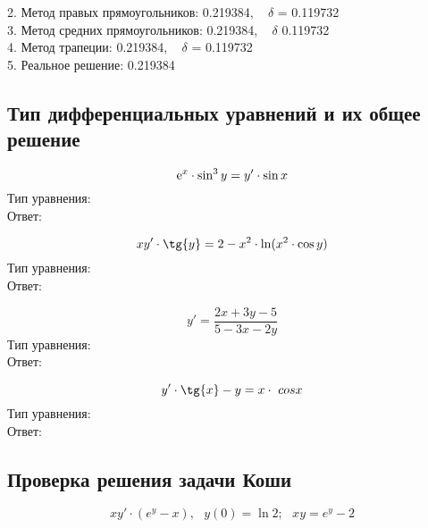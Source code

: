 \documentclass[14pt, titlepage, fleqn]{extarticle}
\begin{document}
2. Метод правых прямоугольников: 0.219384, ~ $\delta$ = 0.119732\\

3. Метод средних прямоугольников: 0.219384, ~ $\delta$ 0.119732\\

4. Метод трапеции: 0.219384, ~ $\delta$ = 0.119732\\

5. Реальное решение: 0.219384

\newpage
	\subsection*{Тип дифференциальных уравнений и их общее решение}

	$${\rm e}^{x} \cdot \sin^{3}{y} = y'\cdot \sin{x}$$ 
	Тип уравнения:\\	
	Ответ: 
	\begin{equation}
	\end{equation}

	$$xy' \cdot \tg{y} = 2 - x^2 \cdot \ln(x^2 \cdot \cos{y})$$
	Тип уравнения:\\
	Ответ:
	\begin{equation}
	\end{equation}

	$$y' = \frac{2x + 3y - 5}{5 - 3x - 2y}$$ 
	Тип уравнения:\\
	Ответ:
	\begin{equation}
	\end{equation}
	
	$$y' \cdot \tg{x} - y = x \cdot \ cos{x}$$ 
	Тип уравнения:\\
	Ответ:
	\begin{equation}
	\end{equation}

	\newpage
	\subsection*{Проверка решения задачи Коши}
		$$xy' \cdot (e^{y} - x), ~~~y(0) = \ln{2}; ~~~xy = e^y-2$$
		
\end{document}
